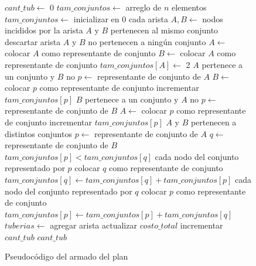 \begin{figure}[!ht]
\begin{codebox}
\li $cant\_tub \leftarrow$ 0
\li $tam\_conjuntos \leftarrow$ arreglo de $n$ elementos
\li $tam\_conjuntos \leftarrow$ inicializar en 0
\li \For cada arista
\li 	\Do 
		$A,B \leftarrow$ nodos incididos por la arista
\li 		\If $A$ y $B$ pertenecen al mismo conjunto
\li 		\Then descartar arista
\li 		\Else
\li			\If $A$ y $B$ no pertenecen a ningún conjunto
\li 			\Then 
				$A \leftarrow$ colocar $A$ como representante de conjunto
\li 				$B \leftarrow$ colocar $A$ como representante de conjunto
\li 				$tam\_conjuntos[A] \leftarrow$ 2
\li			\Else \If $A$ pertenece a un conjunto y $B$ no
\li 				\Then 
					$p \leftarrow$ representante de conjunto de $A$
\li 					$B \leftarrow$ colocar $p$ como representante de conjunto
\li	 				incrementar $tam\_conjuntos[p]$
				\End
\li 			\Else \If $B$ pertenece a un conjunto y $A$ no
\li 				\Then 
					$p \leftarrow$ representante de conjunto de $B$
\li 					$A \leftarrow$ colocar $p$ como representante de conjunto
\li 					incrementar $tam\_conjuntos[p]$
				\End
\li 			\Else \If $A$ y $B$ pertenecen a distintos conjuntos
\li 				\Then
					$p \leftarrow$ representante de conjunto de $A$
\li 					$q \leftarrow$ representante de conjunto de $B$
\li 					\If $tam\_conjuntos[p] < tam\_conjuntos[q]$
\li 					\Then
						\For cada nodo del conjunto representado por $p$
\li 						\Do colocar $q$ como representante de conjunto
						\End
\li 						$tam\_conjuntos[q] \leftarrow tam\_conjuntos[q] + tam\_conjuntos[p]$
\li					\Else 
\li 						\For cada nodo del conjunto representado por $q$
\li						\Do colocar $p$ como representante de conjunto
						\End
\li 						$tam\_conjuntos[p] \leftarrow tam\_conjuntos[p] + tam\_conjuntos[q]$
					\End
				\End
			\End
\li 			$tuberias \leftarrow$ agregar arista
\li 			actualizar $costo\_total$
\li 			incrementar $cant\_tub$
		\End
	\End
\li \Return $cant\_tub$
\end{codebox} 
\caption{Pseudocódigo del armado del plan}\label{code:petroleo.plan}
\end{figure}


